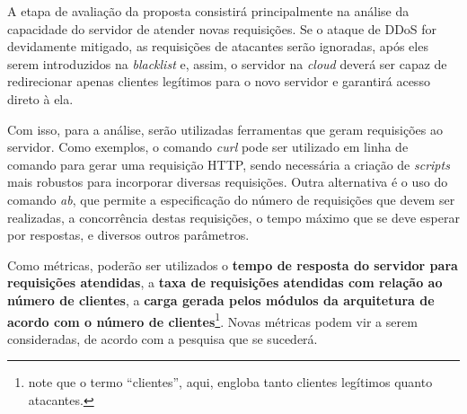 A etapa de avaliação da proposta consistirá principalmente na análise
da capacidade do servidor de atender novas requisições. Se o ataque de DDoS for devidamente
mitigado, as requisições de atacantes serão ignoradas, após eles serem introduzidos na \emph{blacklist}
e, assim, o servidor na \emph{cloud} deverá ser capaz de redirecionar apenas clientes legítimos 
para o novo servidor e garantirá acesso direto à ela.

Com isso, para a análise, serão utilizadas ferramentas que geram requisições ao servidor. Como exemplos, o comando 
\emph{curl} pode ser utilizado em linha de comando para gerar uma requisição HTTP, sendo necessária a criação de \emph{scripts} mais robustos para incorporar diversas requisições. Outra alternativa é o uso do comando \emph{ab}, que permite a especificação do número de requisições que devem ser realizadas, a concorrência destas requisições, o tempo máximo que se deve esperar por respostas, e diversos outros parâmetros.

Como métricas, poderão ser utilizados o \textbf{tempo de resposta do servidor para requisições atendidas}, a \textbf{taxa de requisições atendidas com relação ao número de clientes}, a \textbf{carga gerada pelos módulos da arquitetura de acordo com o número de clientes}\footnote{note que o termo ``clientes'', aqui, engloba tanto clientes legítimos quanto atacantes.}. Novas métricas podem vir a serem consideradas, de acordo com a pesquisa que se sucederá.
